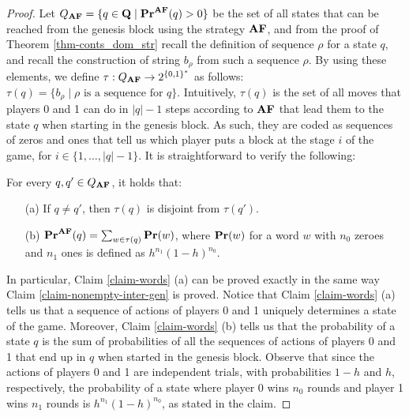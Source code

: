 \begin{proof}
Let $Q_{\text{\rm {\bf AF}}} = \{q \in \mathbf{Q} \mid \mathbf{Pr}^{\text{\rm {\bf AF}}}(q) > 0\}$ be the set of all states that can be reached from the genesis block using the strategy $\text{\rm {\bf AF}}$, and from the proof of Theorem \ref{thm-conts_dom_str} recall the definition of sequence $\rho$ for a state $q$, and recall the construction of string $b_\rho$ from such a sequence $\rho$.
By using these elements, we define $\tau:Q_{\text{\rm {\bf AF}}} \to 2^{\{0,1\}^*}$ as follows:
$\tau(q) = \{ b_\rho \mid \rho \text{ is a sequence for } q\}$.
Intuitively, $\tau(q)$ is the set of all moves that players 0 and 1 can do in $|q|-1$ steps according to $\text{\rm {\bf AF}}$ that lead them to the state $q$ when starting in the genesis block. As such, they are coded as sequences of zeros and ones that tell us which player puts a block at the stage $i$ of the game, for $i \in \{ 1,\ldots, |q|-1\}$. It is straightforward to verify the following:
\begin{myclaim}\label{claim-words} For every $q, q'\in Q_{\text{\rm {\bf AF}}}$, it holds that:
\begin{itemize}
\item[(a)] If $q\neq q'$, then $\tau(q)$ is disjoint from $\tau(q')$.
\item[(b)] $\mathbf{Pr}^{\text{\rm {\bf AF}}}(q) = \sum_{w \in \tau(q)} \mathbf{Pr}(w)$, where $\mathbf{Pr}(w)$ for a word $w$ with $n_0$ zeroes and $n_1$ ones is defined as 
$h^{n_1}(1-h)^{n_0}$.
\end{itemize}
\end{myclaim}
In particular, Claim \ref{claim-words} (a) can be proved exactly in the same way Claim \ref{claim-nonempty-inter-gen} is proved. Notice that Claim \ref{claim-words} (a)
tells us that a sequence of actions of players 0 and 1 uniquely determines a state of the game. 
Moreover, Claim \ref{claim-words} (b)
tells us that the probability of a state $q$ is the sum of probabilities of all the sequences of actions of players 0 and 1 that end up in $q$ when started in the genesis block. Observe that since the actions of players 0 and 1 are independent trials, with probabilities $1-h$ and $h$, respectively, the probability of a state where player 0 wins $n_0$ rounds and player 1 wins $n_1$ rounds is $h^{n_1}(1-h)^{n_0}$, as stated in the claim.



\end{proof}
